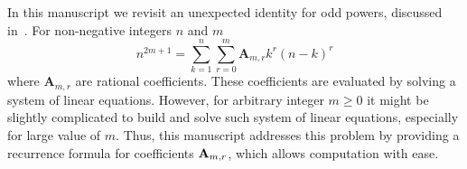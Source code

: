 In this manuscript we revisit an unexpected identity for odd powers, discussed
in~\cite{unusual_identity_for_odd_powers}.
For non-negative integers $n$ and $m$
\[
    n^{2m+1} = \sum_{k=1}^{n} \sum_{r=0}^{m} \mathbf{A}_{m,r} k^r (n-k)^r
\]
where $\mathbf{A}_{m,r}$ are rational coefficients.
These coefficients are evaluated by solving a system of linear equations.
However, for arbitrary integer $m\geq 0$ it might be slightly complicated
to build and solve such system of linear equations,
especially for large value of $m$.
Thus, this manuscript addresses this problem by providing a recurrence formula for coefficients ${\mathbf{A}} \sb{m,r}$,
which allows computation with ease.
